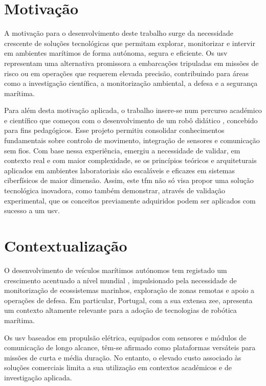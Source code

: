 \section{Motivação}
\label{sec:motivacao}

A motivação para o desenvolvimento deste trabalho surge da necessidade crescente de soluções tecnológicas que permitam explorar, monitorizar e intervir em ambientes marítimos de forma autónoma, segura e eficiente. Os \gls{usv} representam uma alternativa promissora a embarcações tripuladas em missões de risco ou em operações que requerem elevada precisão, contribuindo para áreas como a investigação científica, a monitorização ambiental, a defesa e a segurança marítima.  

Para além desta motivação aplicada, o trabalho insere-se num percurso académico e científico que começou com o desenvolvimento de um robô didático \cite{didactic-robot-thesis}, concebido para fins pedagógicos. Esse projeto permitiu consolidar conhecimentos fundamentais sobre controlo de movimento, integração de sensores e comunicação sem fios. Com base nessa experiência, emergiu a necessidade de validar, em contexto real e com maior complexidade, se os princípios teóricos e arquiteturais aplicados em ambientes laboratoriais são escaláveis e eficazes em sistemas ciberfísicos de maior dimensão. Assim, este \gls{tfm} não só visa propor uma solução tecnológica inovadora, como também demonstrar, através de validação experimental, que os conceitos previamente adquiridos podem ser aplicados com sucesso a um \gls{usv}.  

\section{Contextualização}
\label{sec:contextualizacao}

O desenvolvimento de veículos marítimos autónomos tem registado um crescimento acentuado a nível mundial \cite{gminsights-autonomous-marine-vehicle}, impulsionado pela necessidade de monitorização de ecossistemas marinhos, exploração de zonas remotas e apoio a operações de defesa. Em particular, Portugal, com a sua extensa \gls{zee}, apresenta um contexto altamente relevante para a adoção de tecnologias de robótica marítima.  

Os \gls{usv} baseados em propulsão elétrica, equipados com sensores e módulos de comunicação de longo alcance, têm-se afirmado como plataformas versáteis para missões de curta e média duração. No entanto, o elevado custo associado às soluções comerciais limita a sua utilização em contextos académicos e de investigação aplicada.  

